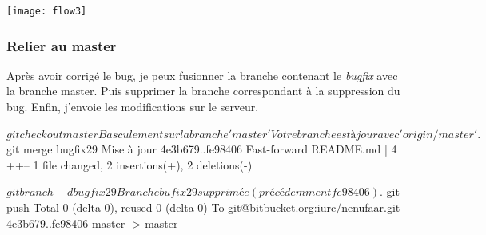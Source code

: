 \documentclass[12pt,a4paper]{article}
\begin{document}
{
}

\vspace{1cm}

\texttt{[image: flow3]}

\newpage

\subsubsection{Relier au master}

Après avoir corrigé le bug, je peux fusionner la branche contenant le \emph{bugfix} avec la branche master. Puis supprimer la branche correspondant à la suppression du bug. Enfin, j'envoie les modifications sur le serveur.

\vspace{1cm}

{
\begin{boxedverbatim}
$ git checkout master
Basculement sur la branche 'master'
Votre branche est à jour avec 'origin/master'.

$ git merge bugfix29 
Mise à jour 4e3b679..fe98406
Fast-forward
 README.md | 4 ++--
 1 file changed, 2 insertions(+), 2 deletions(-)

$ git branch -d bugfix29
Branche bufix29 supprimée (précédemment fe98406).

$ git push
Total 0 (delta 0), reused 0 (delta 0)
To git@bitbucket.org:iurc/nenufaar.git
   4e3b679..fe98406  master -> master
\end{boxedverbatim}
}

\vspace{1cm}
\end{document}
